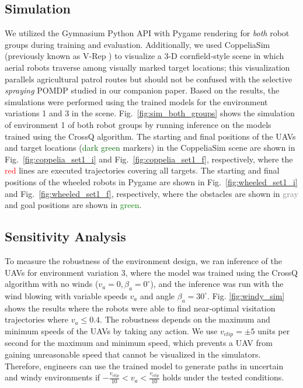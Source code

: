 \documentclass{article}
\begin{document}
\subsection{Simulation}
We utilized the Gymnasium \citep{towers2024gymnasium} Python API with Pygame \citep{pygame} rendering for \emph{both} robot groups during training and evaluation. Additionally, we used CoppeliaSim \citep{coppeliaSim2013} (previously known as V-Rep \citep{vrep2013}) to visualize a 3-D cornfield-style scene in which aerial robots traverse among visually marked target locations; this visualization parallels agricultural patrol routes but should not be confused with the selective \emph{spraying} POMDP studied in our companion paper. Based on the results, the simulations were performed using the trained models for the environment variations 1 and 3 in the scene. Fig.~\ref{fig:sim_both_groups} shows the simulation of environment 1 of both robot groups by running inference on the models trained using the CrossQ \citep{bhatt2024crossq} algorithm. The starting and final positions of the UAVs and target locations (\textcolor{darkgreen}{dark green} markers) in the CoppeliaSim scene are shown in Fig.~\ref{fig:coppelia_set1_i} and  Fig.~\ref{fig:coppelia_set1_f}, respectively, where the \textcolor{red}{red} lines are executed trajectories covering all targets. The starting and final positions of the wheeled robots in Pygame are shown in Fig.~\ref{fig:wheeled_set1_i} and  Fig.~\ref{fig:wheeled_set1_f}, respectively, where the obstacles are shown in \textcolor{gray}{gray} and goal positions are shown in \textcolor{green}{green}.
\subsection{Sensitivity Analysis}
To measure the robustness of the environment design, we ran inference of the UAVs for environment variation 3, where the model was trained using the CrossQ algorithm with no winds ($v_a = 0, \beta_a = 0^{\circ}$), and the inference was run with the wind blowing with variable speeds $v_a$ and angle $\beta_a=30^{\circ}$. Fig. \ref{fig:windy_sim} shows the results where the robots were able to find near-optimal visitation trajectories where $v_a \leq 0.4$. The robustness depends on the maximum and minimum speeds of the UAVs by taking any action. We use $v_{clip} = \pm 5$ units per second for the maximum and minimum speed, which prevents a UAV from gaining unreasonable speed that cannot be visualized in the simulators. Therefore, engineers can use the trained model to generate paths in uncertain and windy environments if $ -\frac{v_{clip}}{10} < v_a < \frac{v_{clip}}{10}$ holds under the tested conditions.
\end{document}
